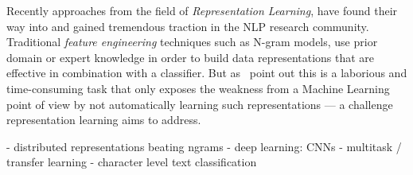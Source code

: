 Recently approaches from the field of \emph{Representation Learning}, have found their way into and gained tremendous traction in the \gls{NLP} research community. Traditional \emph{feature engineering} techniques such as N-gram models, use prior domain or expert knowledge in order to build data representations that are effective in combination with a classifier. But as~\cite{Bengio:2013aa} point out this is a laborious and time-consuming task that only exposes the weakness from a Machine Learning point of view by not automatically learning such representations --- a challenge representation learning aims to address.


- distributed representations beating ngrams
- deep learning: CNNs
- multitask / transfer learning
- character level text classification


